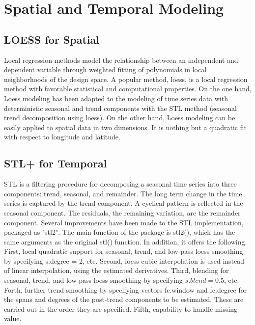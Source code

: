 \section{Spatial and Temporal Modeling}

\subsection{LOESS for Spatial}
Local regression methods model the relationship between an independent and dependent variable 
through weighted fitting of polynomials in local neighborhoods of the design space. A popular 
method, loess, is a local regression method with favorable statistical and computational properties.
On the one hand, Loess modeling has been adapted to the modeling of time series data with 
deterministic seasonal and trend components with the STL method (seasonal trend decomposition using 
loess). On the other hand, Loess modeling can be easily applied to spatial data in two dimensions. 
It is nothing but a quadratic fit with respect to longitude and latitude. 

\subsection{STL+ for Temporal}
STL is a filtering procedure for decomposing a seasonal time series into three components: trend,
seasonal, and remainder. The long term change in the time series is captured by the trend component.
A cyclical pattern is reflected in the seasonal component. The residuals, the remaining variation, 
are the remainder component.
Several improvements have been made to the STL implementation, packaged as "stl2". The main function
of the package is stl2(), which has the same arguments as the original stl() function. In addition, 
it offers the following. First, local quadratic support for seasonal, trend, and low-pass loess 
smoothing by specifying s.degree = 2, etc. Second, loess cubic interpolation is used instead of 
linear interpolation, using the estimated derivatives. Third, blending for seasonal, trend, and 
low-pass loess smoothing by specifying $s.blend = 0.5$, etc. Forth, further trend smoothing by 
specifying vectors fc.window and fc.degree for the spans and degrees of the post-trend components to 
be estimated. These are carried out in the order they are specified. Fifth, capability to handle 
missing value.

